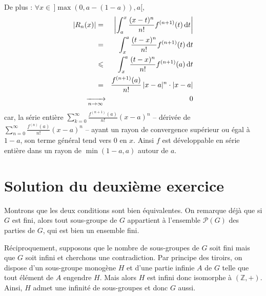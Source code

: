De plus : $\forall x\in \,]\max (0,a-(1-a)),a[,$
\begin{eqnarray*}
|R_{n} (x)| &=& \left| \int _{a} ^{x} \frac{(x-t)^{n} }{n!} f^{(n+1)}(t) \,\mathrm{d}t \right|\\
&=& \int _{x} ^{a} \frac{(t-x)^{n} }{n!} f^{(n+1)}(t) \,\mathrm{d}t\\
&\leqslant & \int _{x} ^{a} \frac{(t-x)^{n} }{n!} f^{(n+1)}(a) \,\mathrm{d}t\\
&=& \frac{f^{(n+1)}(a)}{n!} \, |x-a|^{n} \cdot  |x-a| \\
&\text{\makebox[0mm]{$\xrightarrow[n\rightarrow\infty]{}$}} & \ \ 0
\end{eqnarray*}
car, la série entière $\displaystyle \sum _{k=0} ^{\infty } \frac{f^{(n+1)}(a)}{n!} (x-a)^{n}$ -- dérivée de $\displaystyle \sum _{n=0} ^{\infty } \frac{f^{(n)}(a)}{n!} (x-a)^{n}$ -- ayant un rayon de convergence supérieur ou égal à $1-a$, son terme général tend vers 0 en $x$. Ainsi $f$ est développable en série entière dans un rayon de $\min(1-a,a)$ autour de $a$.


\section{Solution du deuxième exercice} %

Montrons que les deux conditions sont bien équivalentes. On remarque déjà que si 
$G$ est fini, alors tout sous-groupe de $G$ appartient à l'ensemble $\mathscr P(G)$ des parties de $G$, qui est bien un ensemble fini.

Réciproquement, supposons que le nombre de sous-groupes de $G$ soit fini mais que $G$ soit infini et cherchons une contradiction.
Par principe des tiroirs, on dispose d'un sous-groupe monogène $H$ et d'une partie infinie $A$ de $G$ telle que tout élément de $A$ engendre $H$.
Mais alors $H$ est infini donc isomorphe à $(\mathbb Z,+)$. Ainsi, $H$ admet une infinité de sous-groupes et donc $G$ aussi.
